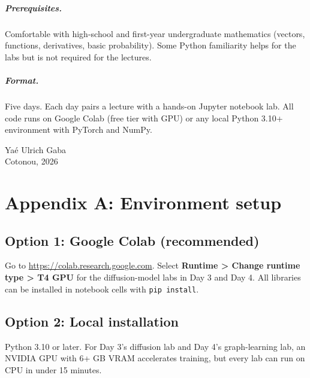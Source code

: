 \documentclass[12pt,a4paper,twoside]{book}
\begin{document}
\paragraph{Prerequisites.} Comfortable with high-school and first-year undergraduate mathematics (vectors, functions, derivatives, basic probability). Some Python familiarity helps for the labs but is not required for the lectures.

\paragraph{Format.} Five days. Each day pairs a lecture with a hands-on Jupyter notebook lab. All code runs on Google Colab (free tier with GPU) or any local Python 3.10+ environment with PyTorch and NumPy.

\vfill
\noindent Yaé Ulrich Gaba\\
Cotonou, 2026

\mainmatter







\backmatter

\chapter*{Appendix A: Environment setup}

\section*{Option 1: Google Colab (recommended)}
Go to \url{https://colab.research.google.com}. Select \textbf{Runtime > Change runtime type > T4 GPU} for the diffusion-model labs in Day 3 and Day 4. All libraries can be installed in notebook cells with \texttt{pip install}.

\section*{Option 2: Local installation}
Python 3.10 or later. For Day 3's diffusion lab and Day 4's graph-learning lab, an NVIDIA GPU with 6+ GB VRAM accelerates training, but every lab can run on CPU in under 15 minutes.
\end{document}

